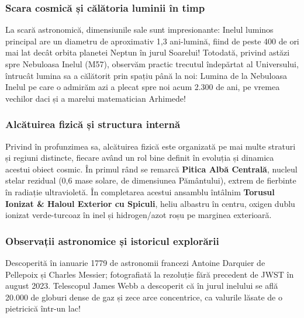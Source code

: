 \subsubsection*{Scara cosmică și călătoria luminii în timp}
La scară astronomică, dimensiunile sale sunt impresionante: Inelul luminos principal are un diametru de aproximativ 1,3 ani-lumină, fiind de peste 400 de ori mai lat decât orbita planetei Neptun în jurul Soarelui! Totodată, privind astăzi spre Nebuloasa Inelul (M57), observăm practic trecutul îndepărtat al Universului, întrucât lumina sa a călătorit prin spațiu până la noi: Lumina de la Nebuloasa Inelul pe care o admirăm azi a plecat spre noi acum 2.300 de ani, pe vremea vechilor daci și a marelui matematician Arhimede!

\subsubsection*{Alcătuirea fizică și structura internă}
Privind în profunzimea sa, alcătuirea fizică este organizată pe mai multe straturi și regiuni distincte, fiecare având un rol bine definit în evoluția și dinamica acestui obiect cosmic. În primul rând se remarcă \textbf{Pitica Albă Centrală}, nucleul stelar rezidual (0,6 mase solare, de dimensiunea Pământului), extrem de fierbinte în radiație ultravioletă. În completarea acestui ansamblu întâlnim \textbf{Torusul Ionizat \& Haloul Exterior cu Spiculi}, heliu albastru în centru, oxigen dublu ionizat verde-turcoaz în inel și hidrogen/azot roșu pe marginea exterioară.

\subsubsection*{Observații astronomice și istoricul explorării}
Descoperită în ianuarie 1779 de astronomii francezi Antoine Darquier de Pellepoix și Charles Messier; fotografiată la rezoluție fără precedent de JWST în august 2023. Telescopul James Webb a descoperit că în jurul inelului se află 20.000 de globuri dense de gaz și zece arce concentrice, ca valurile lăsate de o pietricică într-un lac!

